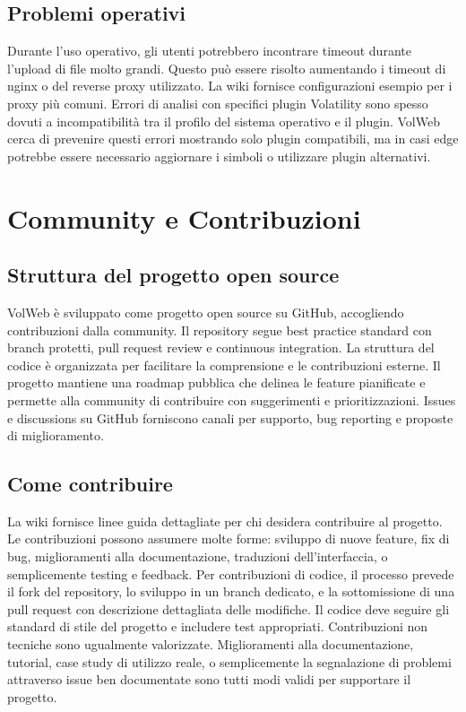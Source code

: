 \subsection{Problemi operativi}
Durante l'uso operativo, gli utenti potrebbero incontrare timeout durante l'upload di file molto grandi. Questo può essere risolto aumentando i timeout di nginx o del reverse proxy utilizzato. La wiki fornisce configurazioni esempio per i proxy più comuni.
Errori di analisi con specifici plugin Volatility sono spesso dovuti a incompatibilità tra il profilo del sistema operativo e il plugin. VolWeb cerca di prevenire questi errori mostrando solo plugin compatibili, ma in casi edge potrebbe essere necessario aggiornare i simboli o utilizzare plugin alternativi.

\section{Community e Contribuzioni}
\subsection{Struttura del progetto open source}
VolWeb è sviluppato come progetto open source su GitHub, accogliendo contribuzioni dalla community. Il repository segue best practice standard con branch protetti, pull request review e continuous integration. La struttura del codice è organizzata per facilitare la comprensione e le contribuzioni esterne.
Il progetto mantiene una roadmap pubblica che delinea le feature pianificate e permette alla community di contribuire con suggerimenti e prioritizzazioni. Issues e discussions su GitHub forniscono canali per supporto, bug reporting e proposte di miglioramento.
\subsection{Come contribuire}
La wiki fornisce linee guida dettagliate per chi desidera contribuire al progetto. Le contribuzioni possono assumere molte forme: sviluppo di nuove feature, fix di bug, miglioramenti alla documentazione, traduzioni dell'interfaccia, o semplicemente testing e feedback.
Per contribuzioni di codice, il processo prevede il fork del repository, lo sviluppo in un branch dedicato, e la sottomissione di una pull request con descrizione dettagliata delle modifiche. Il codice deve seguire gli standard di stile del progetto e includere test appropriati.
Contribuzioni non tecniche sono ugualmente valorizzate. Miglioramenti alla documentazione, tutorial, case study di utilizzo reale, o semplicemente la segnalazione di problemi attraverso issue ben documentate sono tutti modi validi per supportare il progetto.

